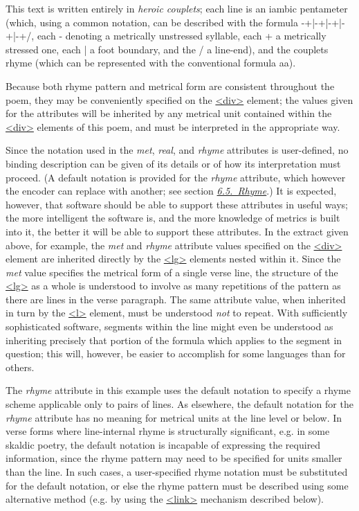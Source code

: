 This text is written entirely in \textit{heroic couplets}; each line is an iambic pentameter (which, using a common notation, can be described with the formula -+|-+|-+|-+|-+/, each - denoting a metrically unstressed syllable, each + a metrically stressed one, each | a foot boundary, and the / a line-end), and the couplets rhyme (which can be represented with the conventional formula aa).\par
Because both rhyme pattern and metrical form are consistent throughout the poem, they may be conveniently specified on the \hyperref[TEI.div]{<div>} element; the values given for the attributes will be inherited by any metrical unit contained within the \hyperref[TEI.div]{<div>} elements of this poem, and must be interpreted in the appropriate way.\par
Since the notation used in the {\itshape met}, {\itshape real}, and {\itshape rhyme} attributes is user-defined, no binding description can be given of its details or of how its interpretation must proceed. (A default notation is provided for the {\itshape rhyme} attribute, which however the encoder can replace with another; see section \textit{\hyperref[VERH]{6.5.\ Rhyme}}.) It is expected, however, that software should be able to support these attributes in useful ways; the more intelligent the software is, and the more knowledge of metrics is built into it, the better it will be able to support these attributes. In the extract given above, for example, the {\itshape met} and {\itshape rhyme} attribute values specified on the \hyperref[TEI.div]{<div>} element are inherited directly by the \hyperref[TEI.lg]{<lg>} elements nested within it. Since the {\itshape met} value specifies the metrical form of a single verse line, the structure of the \hyperref[TEI.lg]{<lg>} as a whole is understood to involve as many repetitions of the pattern as there are lines in the verse paragraph. The same attribute value, when inherited in turn by the \hyperref[TEI.l]{<l>} element, must be understood \textit{not} to repeat. With sufficiently sophisticated software, segments within the line might even be understood as inheriting precisely that portion of the formula which applies to the segment in question; this will, however, be easier to accomplish for some languages than for others.\par
The {\itshape rhyme} attribute in this example uses the default notation to specify a rhyme scheme applicable only to pairs of lines. As elsewhere, the default notation for the {\itshape rhyme} attribute has no meaning for metrical units at the line level or below. In verse forms where line-internal rhyme is structurally significant, e.g. in some skaldic poetry, the default notation is incapable of expressing the required information, since the rhyme pattern may need to be specified for units smaller than the line. In such cases, a user-specified rhyme notation must be substituted for the default notation, or else the rhyme pattern must be described using some alternative method (e.g. by using the \hyperref[TEI.link]{<link>} mechanism described below).\par
